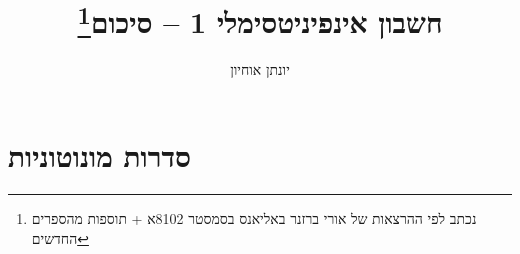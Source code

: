 \documentclass[11pt, oneside]{article}
\title{חשבון אינפיניטסימלי 1 -- סיכום\thanks{נכתב לפי ההרצאות של אורי ברזנר באליאנס בסמסטר 8102א + תוספות מהספרים החדשים}}
\author{יונתן אוחיון}
\begin{document}
\maketitle




\clearpage


\clearpage


\clearpage

\section*{סדרות מונוטוניות}
\end{document}
